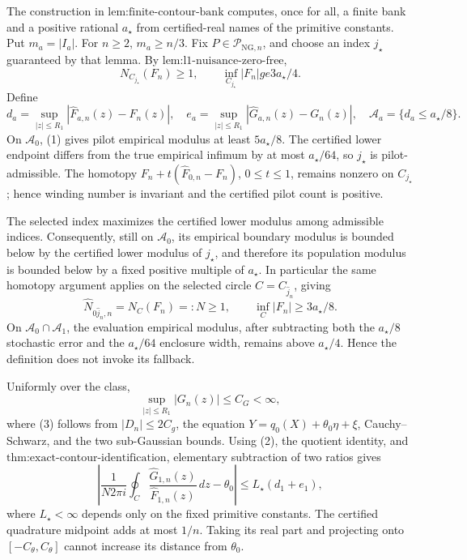 The construction in \(\text{lem:finite-contour-bank}\) computes, once for all, a finite bank and a positive rational \(a_{\star}\) from certified-real names of the primitive constants.  Put \(m_a=|I_a|\).  For \(n\ge2\), \(m_a\ge n/3\).  Fix \(P\in\mathcal P_{\mathrm{NG},n}\), and choose an index \(j_{\star}\) guaranteed by that lemma.  By \(\text{lem:l1-nuisance-zero-free}\),
\[
 N_{C_{j_{\star}}}(F_n)\ge1,
 \qquad
 \inf_{C_{j_{\star}}}|F_n|ge3a_{\star}/4. \tag{1}
\]
Define
\[
 d_a=\sup_{|z|\le R_1}|\widehat F_{a,n}(z)-F_n(z)|,
 \quad
 e_a=\sup_{|z|\le R_1}|\widehat G_{a,n}(z)-G_n(z)|,
 \quad
 \mathcal A_a=\{d_a\le a_{\star}/8\}.
\]
On \(\mathcal A_0\), (1) gives pilot empirical modulus at least \(5a_{\star}/8\).  The certified lower endpoint differs from the true empirical infimum by at most \(a_{\star}/64\), so \(j_{\star}\) is pilot-admissible.  The homotopy
\(F_n+t(\widehat F_{0,n}-F_n)\), \(0\le t\le1\), remains nonzero on \(C_{j_{\star}}\); hence winding number is invariant and the certified pilot count is positive.

The selected index maximizes the certified lower modulus among admissible indices.  Consequently, still on \(\mathcal A_0\), its empirical boundary modulus is bounded below by the certified lower modulus of \(j_{\star}\), and therefore its population modulus is bounded below by a fixed positive multiple of \(a_{\star}\).  In particular the same homotopy argument applies on the selected circle \(C=C_{\widehat j_n}\), giving
\[
 \widehat N_{0\widehat j_n,n}=N_C(F_n)=:N\ge1,
 \qquad
 \inf_C|F_n|\ge3a_{\star}/8. \tag{2}
\]
On \(\mathcal A_0\cap\mathcal A_1\), the evaluation empirical modulus, after subtracting both the \(a_{\star}/8\) stochastic error and the \(a_{\star}/64\) enclosure width, remains above \(a_{\star}/4\).  Hence the definition does not invoke its fallback.

Uniformly over the class,
\[
 \sup_{|z|\le R_1}|G_n(z)|\le C_G<\infty, \tag{3}
\]
where (3) follows from \(|D_n|\le2C_g\), the equation \(Y=q_0(X)+\theta_0\eta+\xi\), Cauchy--Schwarz, and the two sub-Gaussian bounds.  Using (2), the quotient identity, and \(\text{thm:exact-contour-identification}\), elementary subtraction of two ratios gives
\[
 \left|
 \frac{1}{N2\pi i}\oint_C
 \frac{\widehat G_{1,n}(z)}{\widehat F_{1,n}(z)}\,dz
 -\theta_0
 \right|
 \le L_{\star}(d_1+e_1), \tag{4}
\]
where \(L_{\star}<\infty\) depends only on the fixed primitive constants.  The certified quadrature midpoint adds at most \(1/n\).  Taking its real part and projecting onto \([-C_{\theta},C_{\theta}]\) cannot increase its distance from \(\theta_0\).

